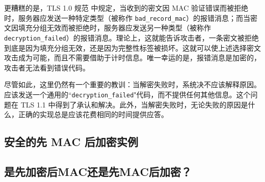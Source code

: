 \begin{snote}[信息性报错消息。]
更糟糕的是，TLS 1.0 规范 \cite{dierks1999rfc2246} 中规定，当收到的密文因 MAC 验证错误而被拒绝时，服务器应发送一种特定类型（被称作 \texttt{bad\_record\_mac}）的报错消息；而当密文因填充分组无效而被拒绝时，服务器应发送另一种类型（被称作 \texttt{decryption\_failed}）的报错消息。理论上，这就能告诉攻击者，一条密文被拒绝到底是因为填充分组无效，还是因为完整性标签被损坏。这就可以使上述选择密文攻击成为可能，而且不需要借助于计时信息。唯一幸运的是，报错消息是加密的，攻击者无法看到错误代码。

尽管如此，这里仍然有一个重要的教训：当解密失败时，系统决不应该解释原因。应该发送一个通用的``\texttt{decryption\_failed}"代码，而不提供任何其他信息。这个问题在 TLS 1.1 中得到了承认和解决。此外，当解密失败时，无论失败的原因是什么，正确的实现总是应该花费相同的时间提供应答。
\end{snote}

\subsection{安全的先 MAC 后加密实例}\label{subsec:9-4-4}

\begin{theorem}\label{theo:9-3}
	
\end{theorem}

\subsection{是先加密后MAC还是先MAC后加密？}\label{subsec:9-4-5}